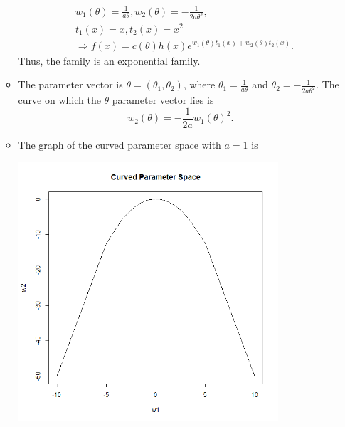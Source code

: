 \documentclass[12pt]{article}
\newenvironment{problem}[2][Problem]{\begin{trivlist}
\item[\hskip \labelsep {\bfseries #1}\hskip \labelsep {\bfseries #2.}]}
{\end{trivlist}}
\begin{document}
\begin{problem}{7}
\begin{itemize}
\begin{itemize}
\[\begin{aligned}
          &w_1(\theta) = \frac{1}{a\theta}, w_2(\theta) = -\frac{1}{2a\theta^2},\\
          &t_1(x) = x, t_2(x) = x^2\\
          &\Rightarrow f(x) = c(\theta) h(x) e^{w_1(\theta) t_1(x) +
          w_2(\theta) t_2(x)}.
        \end{aligned}
      \]
      Thus, the family is an exponential family.
      \item [(ii)] The parameter vector is $\theta = (\theta_1, \theta_2)$,
      where $\theta_1 = \frac{1}{a\theta}$ and $\theta_2 = -\frac{1}{2a\theta^2}$.
      The curve on which the $\theta$ parameter vector lies is
      \[
        w_2(\theta) = -\frac{1}{2a} w_1(\theta)^2.
      \]
      \item [(iii)]
      The graph of the curved parameter space with $a=1$ is
      \begin{center}
        \includegraphics[width=0.8\textwidth]{7b.png}
      \end{center}
    \end{itemize}
  \end{itemize}
\end{problem}
\end{document}
